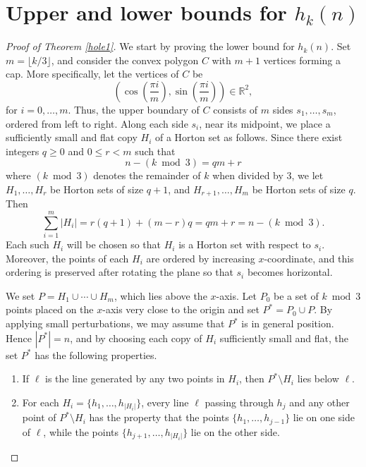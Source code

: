 \documentclass[11pt]{article}
\theoremstyle{plain}
\theoremstyle{definition}
\theoremstyle{remark}
\begin{document}
\section{Upper and lower bounds for $h_k(n)$}
\begin{proof}[Proof of Theorem \ref{hole1}] We start by proving the lower bound for $h_k(n)$.   Set \(m=\lfloor k/3\rfloor\), and consider the convex polygon \(C\) with \(m+1\) vertices forming a cap. More specifically, let the vertices of \(C\) be
\[
\left(\cos\left(\frac{\pi i}{m}\right),\sin\left(\frac{\pi i}{m}\right)\right)\in\mathbb{R}^2,
\]
for \(i=0,\ldots,m\). Thus, the upper boundary of \(C\) consists of \(m\) sides \(s_1,\ldots,s_m\), ordered from left to right.  Along each side \(s_i\), near its midpoint, we place a sufficiently small and flat copy \(H_i\) of a Horton set as follows.  Since there exist integers \(q\ge 0\) and \(0\le r<m\) such that
\[
n-(k\bmod 3)=q m+r
\]
where $(k\bmod 3)$ denotes the remainder of $k$ when divided by $3$, we let \(H_1,\dots,H_r\) be Horton sets of size \(q+1\), and \(H_{r+1},\dots,H_{m}\) be Horton sets of size \(q\). Then
\[
\sum_{i=1}^{m}|H_i|
=
r(q+1)+\left(m-r\right)q
=
qm+r
=
n-(k\bmod 3).
\]
Each such $H_i$ will be chosen so that \(H_i\) is a Horton set with respect to \(s_i\). Moreover, the points of each \(H_i\) are ordered by increasing \(x\)-coordinate, and this ordering is preserved after rotating the plane so that \(s_i\) becomes horizontal.




We set $P =  H_1\cup \cdots \cup H_m$, which lies above the $x$-axis. Let $P_0$ be a set of $k\bmod 3$ points placed on the $x$-axis very close to the origin and set $P^{\ast} = P_0\cup P$. By applying small perturbations, we may assume that $P^{\ast}$ is in general position. Hence $|P^{\ast}|=n$, and by choosing each copy of $H_i$ sufficiently small and flat, the set $P^{\ast}$ has the following properties.




\begin{enumerate}
    \item If $\ell$ is the line generated by any two points in $H_i$, then $P^{\ast}\setminus H_i$ lies below $\ell$.  

    
\item For each \(H_i=\{h_1,\ldots,h_{|H_i|}\}\), every line \(\ell\) passing through \(h_j\) and any other point of \(P^{\ast}\setminus H_i\) has the property that the points \(\{h_1,\ldots,h_{j-1}\}\) lie on one side of \(\ell\), while the points \(\{h_{j+1},\ldots,h_{|H_i|}\}\) lie on the other side.
\end{enumerate}






\end{proof}
\end{document}
